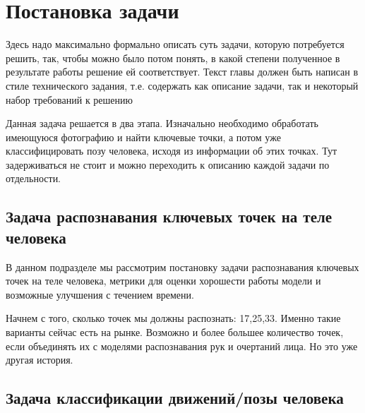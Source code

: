 \section{Постановка задачи}
\label{sec:Chapter1} 
Здесь надо максимально формально описать суть задачи, которую потребуется решить, так, чтобы можно было потом понять, в какой степени полученное в результате работы решение ей соответствует. Текст главы должен быть написан в стиле технического задания, т.е. содержать как описание задачи, так и некоторый набор требований к решению

Данная задача решается в два этапа. Изначально необходимо обработать имеющуюся фотографию и найти ключевые точки, а потом уже классифицировать позу человека, исходя из информации об этих точках. Тут задерживаться не стоит и можно переходить к описанию каждой задачи по отдельности.

\subsection{Задача распознавания ключевых точек на теле человека}

В данном подразделе мы рассмотрим постановку задачи распознавания ключевых точек на теле человека, метрики для оценки хорошести работы модели и возможные улучшения с течением времени.

Начнем с того, сколько точек мы должны распознать: 17,25,33. Именно такие варианты сейчас есть на рынке. Возможно и более большее количество точек, если объединять их с моделями распознавания рук и очертаний лица. Но это уже другая история.

\subsection{Задача классификации движений/позы человека}
\newpage